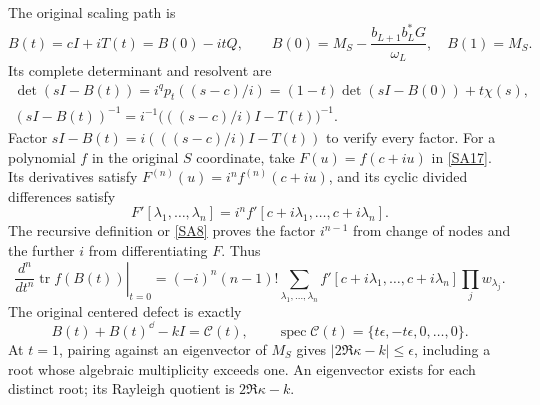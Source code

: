 \documentclass[11pt]{article}
\newcommand{\tr}{\operatorname{tr}}\newcommand{\Res}{\operatorname{Res}}
\begin{document}
The original scaling path is
\begin{equation}\tag{SA32}\label{SA32}
B(t)=cI+iT(t)=B(0)-itQ,\qquad
B(0)=M_S-\frac{b_{L+1}b_L^*G}{\omega_L},\quad
B(1)=M_S.
\end{equation}
Its complete determinant and resolvent are
\begin{equation}\tag{SA33}\label{SA33}
\begin{gathered}
\det(sI-B(t))=i^qp_t((s-c)/i)
=(1-t)\det(sI-B(0))+t\chi(s),\\
(sI-B(t))^{-1}
=i^{-1}\big(((s-c)/i)I-T(t)\big)^{-1}.
\end{gathered}
\end{equation}
Factor $sI-B(t)=i(((s-c)/i)I-T(t))$ to verify every
factor. For a polynomial $f$ in the original $S$
coordinate, take $F(u)=f(c+iu)$ in \eqref{SA17}.
Its derivatives satisfy $F^{(n)}(u)=i^nf^{(n)}(c+iu)$,
and its cyclic divided differences satisfy
\begin{equation}\tag{SA34}\label{SA34}
F'[\lambda_1,\ldots,\lambda_n]
=i^n f'[c+i\lambda_1,\ldots,c+i\lambda_n].
\end{equation}
The recursive definition or \eqref{SA8} proves the
factor $i^{n-1}$ from change of nodes and the further
$i$ from differentiating $F$. Thus
\begin{equation}\tag{SA35}\label{SA35}
\left.\frac{d^n}{dt^n}\tr f(B(t))\right|_{t=0}
=(-i)^n(n-1)!
\sum_{\lambda_1,\ldots,\lambda_n}
f'[c+i\lambda_1,\ldots,c+i\lambda_n]\prod_jw_{\lambda_j}.
\end{equation}
The original centered defect is exactly
\begin{equation}\tag{SA36}\label{SA36}
B(t)+B(t)^{\dd}-kI
=\mathcal C(t),\qquad
\operatorname{spec}\mathcal C(t)
=\{t\epsilon,-t\epsilon,0,\ldots,0\}.
\end{equation}
At $t=1$, pairing against an eigenvector of $M_S$
gives $|2\Re\kappa-k|\leq\epsilon$, including a root
whose algebraic multiplicity exceeds one. An
eigenvector exists for each distinct root; its
Rayleigh quotient is $2\Re\kappa-k$.
\end{document}
